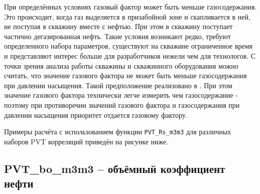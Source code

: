 При определённых условиях газовый фактор может быть меньше газосодержания. Это происходит, когда газ выделяется в призабойной зоне и скапливается в ней, не поступая в скважину вместе с нефтью. При этом в скважину поступает частично дегазированная нефть. Такие условия возникают редко, требуют определенного набора параметров, существуют на скважине ограниченное время и представляют интерес больше для разработчиков нежели чем для технологов. С точки зрения анализа работы скважины и скважинного оборудования можно считать, что значение газового фактора не может быть меньше газосодержания при давлении насыщения. Такой предположение реализовано в \unf{}. При этом значение газового фактора технически легче измерить чем газосодержание - поэтому при противоречии значений газового фактора и газосодержания при давлении насыщения приоритет отдается газовому фактору. 


Примеры расчёта с использованием функции \texttt{PVT_Rs_m3m3} для различных наборов PVT корреляций приведён на рисунке ниже.

\newcommand{\RsDataFile}{data/Rs_P_data.txt}


\subsection{PVT\_bo\_m3m3 – объёмный коэффициент нефти}

